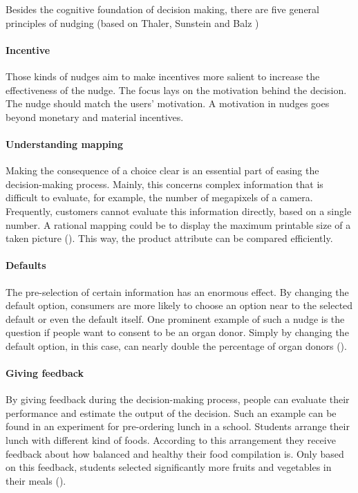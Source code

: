 Besides the cognitive foundation of decision making, there are five general principles of nudging (based on Thaler, Sunstein and Balz \citeyear{thaler_choice_2010})
\paragraph{Incentive}
Those kinds of nudges aim to make incentives more salient to increase the effectiveness of the nudge. The focus lays on the motivation behind the decision. The nudge should match the users' motivation. A motivation in nudges goes beyond monetary and material incentives.
\paragraph{Understanding mapping}
Making the consequence of a choice clear is an essential part of easing the decision-making process. Mainly, this concerns complex information that is difficult to evaluate, for example, the number of megapixels of a camera. Frequently, customers cannot evaluate this information directly, based on a single number. A rational mapping could be to display the maximum printable size of a taken picture (\cite{weinmann_digital_2016}). This way, the product attribute can be compared efficiently.
\paragraph{Defaults}
The pre-selection of certain information has an enormous effect. By changing the default option, consumers are more likely to choose an option near to the selected default or even the default itself. One prominent example of such a nudge is the question if people want to consent to be an organ donor. Simply by changing the default option, in this case, can nearly double the percentage of organ donors (\cite{johnson_defaults_2003}). 
\paragraph{Giving feedback}
By giving feedback during the decision-making process, people can evaluate their performance and estimate the output of the decision. Such an example can be found in an experiment for pre-ordering lunch in a school. Students arrange their lunch with different kind of foods. According to this arrangement they receive feedback about how balanced and healthy their food compilation is. Only based on this feedback, students selected significantly more fruits and vegetables in their meals (\cite{miller_effects_2016}).
